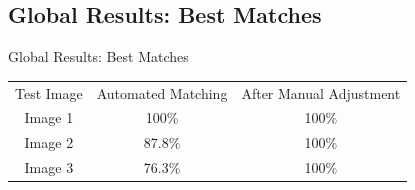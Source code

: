 \documentclass[xcolor=table]{beamer}
\begin{document}
\subsection{Global Results: Best Matches}
\begin{frame}{Global Results: Best Matches}

\begin{table}[h]
\begin{center}
\begin{tabular}[h]{|c|c|c|}
    \hline
    \rowcolor{gray!35}
    Test Image & Automated Matching & After Manual Adjustment\\
    Image 1 & 100\% & 100\% \\
    Image 2 & 87.8\% & 100\% \\
    Image 3 & 76.3\% & 100\% \\
    \hline
    \end{tabular}
\end{center}
\end{table}
\end{frame}
\end{document}
